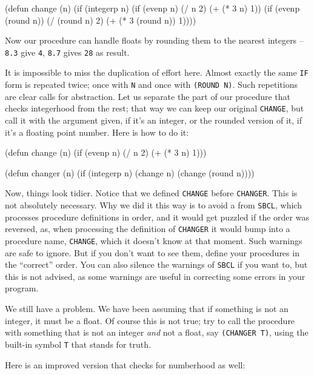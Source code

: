 \documentclass[a4paper,11pt]{article}
\begin{document}
\begin{uenum}
\begin{uenumi}
\begin{lispcode}
(defun change (n)
  (if (integerp n) 
    (if (evenp n)
      (/ n 2)
      (+ (* 3 n) 1))
    (if (evenp (round n))
      (/ (round n) 2)
      (+ (* 3 (round n)) 1))))
\end{lispcode}

Now our procedure can handle floats by rounding them to the nearest integers -- \Verb+8.3+ give \Verb+4+, \Verb+8.7+ gives \Verb+28+ as result.

\item It is impossible to miss the duplication of effort here. Almost exactly the same \Verb+IF+ form is repeated twice; once with \Verb+N+ and once with \Verb+(ROUND N)+. Such repetitions are clear calls for abstraction. Let us separate the part of our procedure that checks integerhood from the rest; that way we can keep our original \Verb+CHANGE+, but call it with the argument given, if it's an integer, or the rounded version of it, if it's a floating point number. Here is how to do it:


\begin{lispcode}
(defun change (n)
  (if (evenp n)
    (/ n 2)
    (+ (* 3 n) 1)))

(defun changer (n)
  (if (integerp n)
    (change n)
    (change (round n))))
\end{lispcode}


Now, things look tidier. Notice that we defined \Verb+CHANGE+ before \Verb+CHANGER+. This is not absolutely necessary. Why we did it this way is to avoid a  from \Verb+SBCL+, which processes procedure definitions in order, and it would get puzzled if the order was reversed, as, when processing the definition of \Verb+CHANGER+ it would bump into a procedure name, \Verb+CHANGE+, which it doesn't know at that moment. Such warnings are safe to ignore. But if you don't want to see them, define your procedures in the ``correct'' order. You can also silence the warnings of \Verb+SBCL+ if you want to, but this is not advised, as some warnings are useful in correcting some errors in your program.


\item We still have a problem. We have been assuming that if something is not an integer, it must be a float. Of course this is not true; try to call the procedure with something that is not an integer \emph{and} not a float, say \Verb+(CHANGER T)+, using the built-in symbol \Verb+T+ that stands for truth.

\item Here is an improved version that checks for numberhood as well:


\end{uenumi}
\end{uenum}
\end{document}
